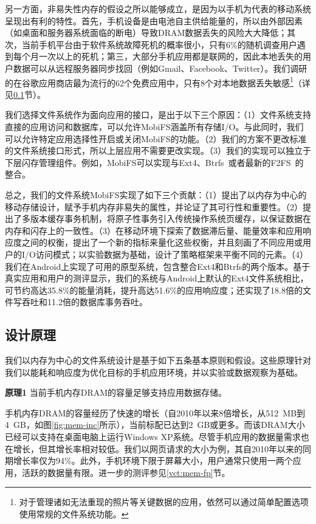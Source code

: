 另一方面，非易失性内存的假设之所以能够成立，是因为以手机为代表的移动系统呈现出有利的特性。首先，手机设备是由电池自主供给能量的，所以由外部因素（如桌面和服务器系统面临的断电）导致DRAM数据丢失的风险大大降低；其次，当前手机平台由于软件系统故障死机的概率很小，只有6\%的随机调查用户遇到每个月一次以上的死机；第三，大部分手机应用都是联网的，因此本地丢失的用户数据可以从远程服务器同步找回（例如Gmail、Facebook、Twitter）。我们调研的在谷歌应用商店最为流行的62个免费应用中，只有8个对本地数据丢失敏感\footnote{对于管理诸如无法重现的照片等关键数据的应用，依然可以通过简单配置选项使用常规的文件系统功能。}（详见\ref{vct:insight}节）。

我们选择文件系统作为面向应用的接口，是出于以下三个原因：（1）文件系统支持直接的应用访问和数据库，可以允许MobiFS涵盖所有存储I/O。与此同时，我们可以允许特定应用选择性开启或关闭MobiFS的功能。（2）我们的方案不更改标准的文件系统接口形式，所以上层应用不需要更改实现。（3）我们的实现可以独立于下层闪存管理组件。例如，MobiFS可以实现与Ext4、Btrfs~\cite{Rodeh:2013:BLB:2501620.2501623}或者最新的F2FS~\cite{188454}的整合。

总之，我们的文件系统MobiFS实现了如下三个贡献：（1）提出了以内存为中心的移动存储设计，赋予手机内存非易失的属性，并论证了其可行性和重要性。（2）提出了多版本缓存事务机制，将原子性事务引入传统操作系统页缓存，以保证数据在内存和闪存上的一致性。（3）在移动环境下探索了数据滞后量、能量效率和应用响应度之间的权衡，提出了一个新的指标来量化这些权衡，并且刻画了不同应用或用户的I/O访问模式；以实验数据为基础，设计了策略框架来平衡不同的元素。（4）我们在Android上实现了可用的原型系统，包含整合Ext4和Btrfs的两个版本。基于真实应用和用户的测评显示，我们的系统与Android上默认的Ext4文件系统相比，可节约高达35.8\%的能量消耗，提升高达51.6\%的应用响应度；还实现了18.8倍的文件写吞吐和11.2倍的数据库事务吞吐。

\subsection{设计原理}
\label{vct:insight}

我们以内存为中心的文件系统设计是基于如下五条基本原则和假设。这些原理针对我们以能耗和响应度为优化目标的手机应用环境，并以实验或数据观察为基础。

\textbf{原理1} 当前手机内存DRAM的容量足够支持应用数据存储。

手机内存DRAM的容量经历了快速的增长（自2010年以来8倍增长，从512~MB到4~GB，如图\ref{fig:mem-inc}所示），当前标配已达到2~GB或更多。而该DRAM大小已经可以支持在桌面电脑上运行Windows XP系统。尽管手机应用的数据量需求也在增长，但其增长率相对较低。我们以网页请求的大小为例，其自2010年以来的同期增长率仅为94\%\cite{HTTP:Transfer:2013}。此外，手机环境下限于屏幕大小，用户通常只使用一两个应用，活跃的数据量有限。进一步的测评参见\ref{vct:mem-fp}节。

